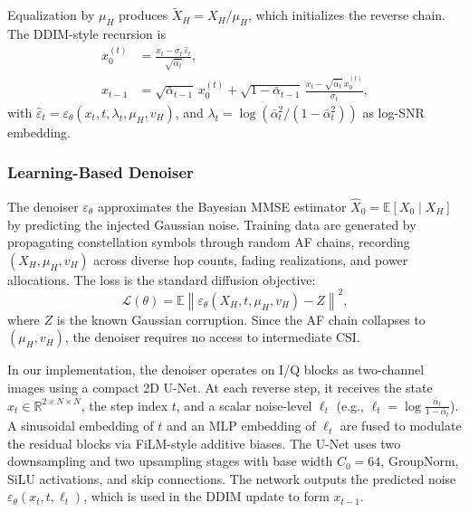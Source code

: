 \documentclass[journal]{IEEEtran}
\begin{document}
Equalization by $\mu_H$ produces $\tilde X_H=X_H/\mu_H$, which initializes the reverse chain. 
The DDIM-style recursion is
\begin{align}
x_0^{(t)} &= \frac{x_t - \sigma_t \,\widehat\varepsilon_t}{\sqrt{\bar\alpha_t}},\\
x_{t-1} &= \sqrt{\bar\alpha_{t-1}}\,x_0^{(t)} 
+ \sqrt{1-\bar\alpha_{t-1}}\,
\frac{x_t-\sqrt{\bar\alpha_t}\,x_0^{(t)}}{\sigma_t},
\end{align}
with $\widehat\varepsilon_t=\varepsilon_\theta(x_t,t,\lambda_t,\mu_H,v_H)$, 
and $\lambda_t=\log(\bar\alpha_t^2/(1-\bar\alpha_t^2))$ as log-SNR embedding.

\subsubsection{Learning-Based Denoiser}

The denoiser $\varepsilon_\theta$ approximates the Bayesian MMSE estimator 
$\hat X_0=\mathbb{E}[X_0\mid X_H]$ by predicting the injected Gaussian noise. 
Training data are generated by propagating constellation symbols through 
random AF chains, recording $(X_H,\mu_H,v_H)$ across diverse hop counts, 
fading realizations, and power allocations. 
The loss is the standard diffusion objective:
\[
\mathcal{L}(\theta)=\mathbb{E}\left\|\varepsilon_\theta(X_H,t,\mu_H,v_H)-Z\right\|^2,
\]
where $Z$ is the known Gaussian corruption. 
Since the AF chain collapses to $(\mu_H,v_H)$, 
the denoiser requires no access to intermediate CSI. 

In our implementation, the denoiser operates on I/Q blocks as two-channel images using a compact 2D U-Net. 
At each reverse step, it receives the state $x_t \in \mathbb{R}^{2\times N\times N}$, the step index $t$, and a scalar noise-level $\ell_t$ (e.g., $\ell_t=\log\!\tfrac{\bar\alpha_t}{1-\bar\alpha_t}$). 
A sinusoidal embedding of $t$ and an MLP embedding of $\ell_t$ are fused to modulate the residual blocks via FiLM-style additive biases. 
The U-Net uses two downsampling and two upsampling stages with base width $C_0{=}64$, GroupNorm, SiLU activations, and skip connections. 
The network outputs the predicted noise $\varepsilon_\theta(x_t,t,\ell_t)$, which is used in the DDIM update to form $x_{t-1}$.

\end{document}
